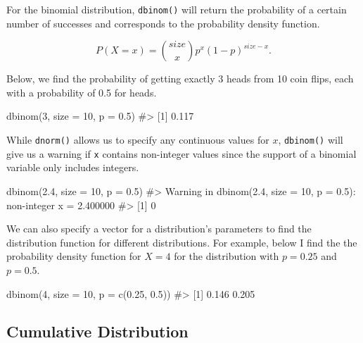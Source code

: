 \documentclass[
  letterpaper,
]{krantz}
\makeatletter
\newenvironment{Shaded}{\begin{snugshade}}{\end{snugshade}}
\newcommand{\AttributeTok}[1]{\textcolor[rgb]{0.40,0.45,0.13}{#1}}
\newcommand{\CommentTok}[1]{\textcolor[rgb]{0.37,0.37,0.37}{#1}}
\newcommand{\DecValTok}[1]{\textcolor[rgb]{0.68,0.00,0.00}{#1}}
\newcommand{\FloatTok}[1]{\textcolor[rgb]{0.68,0.00,0.00}{#1}}
\newcommand{\FunctionTok}[1]{\textcolor[rgb]{0.28,0.35,0.67}{#1}}
\newcommand{\NormalTok}[1]{\textcolor[rgb]{0.00,0.23,0.31}{#1}}
\newenvironment{kframe}{%
\medskip{}
\setlength{\fboxsep}{.8em}
 \def\at@end@of@kframe{}%
 \ifinner\ifhmode%
  \def\at@end@of@kframe{\end{minipage}}%
  \begin{minipage}{\columnwidth}%
 \fi\fi%
 \def\FrameCommand##1{\hskip\@totalleftmargin \hskip-\fboxsep
 \colorbox{shadecolor}{##1}\hskip-\fboxsep
     \hskip-\linewidth \hskip-\@totalleftmargin \hskip\columnwidth}%
 \MakeFramed {\advance\hsize-\width
   \@totalleftmargin\z@ \linewidth\hsize
   \@setminipage}}%
 {\par\unskip\endMakeFramed%
 \at@end@of@kframe}
\renewenvironment{Shaded}{\begin{kframe}}{\end{kframe}}
\makeatother
\begin{document}
For the binomial distribution, \texttt{dbinom()} will return the
probability of a certain number of successes and corresponds to the
probability density function.

\[ P(X = x) = \binom{size}{x} p^x (1-p)^{size-x}. \]

Below, we find the probability of getting exactly 3 heads from 10 coin
flips, each with a probability of 0.5 for heads.

\begin{Shaded}
\begin{Highlighting}[]
\FunctionTok{dbinom}\NormalTok{(}\DecValTok{3}\NormalTok{, }\AttributeTok{size =} \DecValTok{10}\NormalTok{, }\AttributeTok{p =} \FloatTok{0.5}\NormalTok{)}
\CommentTok{\#\textgreater{} [1] 0.117}
\end{Highlighting}
\end{Shaded}

While \texttt{dnorm()} allows us to specify any continuous values for
\(x\), \texttt{dbinom()} will give us a warning if \texttt{x} contains
non-integer values since the support of a binomial variable only
includes integers.

\begin{Shaded}
\begin{Highlighting}[]
\FunctionTok{dbinom}\NormalTok{(}\FloatTok{2.4}\NormalTok{, }\AttributeTok{size =} \DecValTok{10}\NormalTok{, }\AttributeTok{p =} \FloatTok{0.5}\NormalTok{)}
\CommentTok{\#\textgreater{} Warning in dbinom(2.4, size = 10, p = 0.5): non{-}integer x = 2.400000}
\CommentTok{\#\textgreater{} [1] 0}
\end{Highlighting}
\end{Shaded}

We can also specify a vector for a distribution's parameters to find the
distribution function for different distributions. For example, below I
find the the probability density function for \(X=4\) for the
distribution with \(p=0.25\) and \(p=0.5\).

\begin{Shaded}
\begin{Highlighting}[]
\FunctionTok{dbinom}\NormalTok{(}\DecValTok{4}\NormalTok{, }\AttributeTok{size =} \DecValTok{10}\NormalTok{, }\AttributeTok{p =} \FunctionTok{c}\NormalTok{(}\FloatTok{0.25}\NormalTok{, }\FloatTok{0.5}\NormalTok{))}
\CommentTok{\#\textgreater{} [1] 0.146 0.205}
\end{Highlighting}
\end{Shaded}

\hypertarget{cumulative-distribution}{%
\subsection{Cumulative Distribution}\label{cumulative-distribution}}
\end{document}
